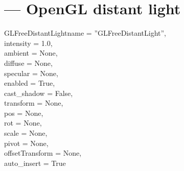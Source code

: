 
\section{ ---
         OpenGL distant light}

\begin{classdesc}{GLFreeDistantLight}{name = ''GLFreeDistantLight'',\\ 
                       intensity = 1.0,\\
                       ambient = None,\\
                       diffuse = None,\\
                       specular = None,\\
                       enabled = True,\\
                       cast_shadow = False,\\
                       transform = None,\\
                       pos = None,\\
                       rot = None,\\
                       scale = None,\\
                       pivot = None,\\
                       offsetTransform = None,\\
                       auto_insert = True}

\end{classdesc}


